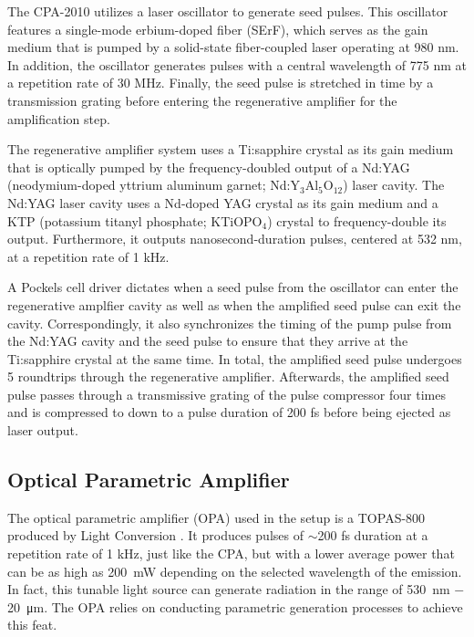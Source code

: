 The CPA-2010 utilizes a laser oscillator to generate seed pulses. This oscillator features a single-mode erbium-doped fiber (SErF), which serves as the gain medium that is pumped by a solid-state fiber-coupled laser operating at 980 nm. In addition, the oscillator generates pulses with a central wavelength of 775 nm at a repetition rate of 30 MHz. Finally, the seed pulse is stretched in time by a transmission grating before entering the regenerative amplifier for the amplification step.

The regenerative amplifier system uses a Ti:sapphire crystal as its gain medium that is optically pumped by the frequency-doubled output of a Nd:YAG (neodymium-doped yttrium aluminum garnet; Nd:Y$_3$Al$_5$O$_{12}$) laser cavity. The Nd:YAG laser cavity uses a Nd-doped YAG crystal as its gain medium and a KTP (potassium titanyl phosphate; KTiOPO$_4$) crystal to frequency-double its output. Furthermore, it outputs nanosecond-duration pulses, centered at 532 nm, at a repetition rate of 1 kHz.

A Pockels cell driver dictates when a seed pulse from the oscillator can enter the regenerative amplfier cavity as well as when the amplified seed pulse can exit the cavity. Correspondingly, it also synchronizes the timing of the pump pulse from the Nd:YAG cavity and the seed pulse to ensure that they arrive at the Ti:sapphire crystal at the same time. In total, the amplified seed pulse undergoes 5 roundtrips through the regenerative amplifier. Afterwards, the amplified seed pulse passes through a transmissive grating of the pulse compressor four times and is compressed to down to a pulse duration of 200 fs before being ejected as laser output.

\subsection{Optical Parametric Amplifier}
\label{section:opa}

The optical parametric amplifier (OPA) used in the setup is a TOPAS-800 produced by Light Conversion \cite{topas}. It produces pulses of $\sim$200 fs duration at a repetition rate of 1 kHz, just like the CPA, but with a lower average power that can be as high as \SI{200}{\milli\watt} depending on the selected wavelength of the emission. In fact, this tunable light source can generate radiation in the range of \SI{530}{\nano\meter} $-$ \SI{20}{\micro\meter}. The OPA relies on conducting parametric generation processes to achieve this feat.

